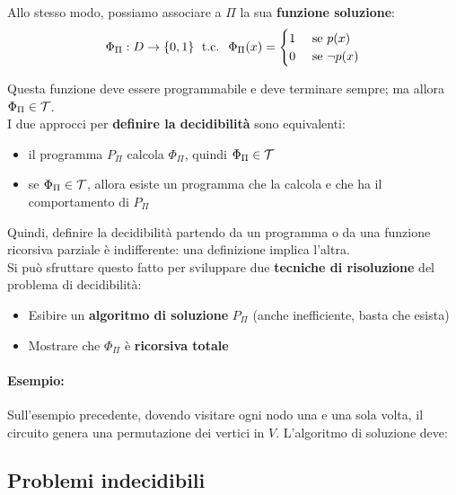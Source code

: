 Allo stesso modo, possiamo associare a $\Pi$ la sua \textbf{funzione soluzione}: 
$$ \Phi_\Pi : D \rightarrow \{0,1\} \; \text{ t.c. } \; \Phi_\Pi (x) = \begin{cases}
	1 & \text{ se } p(x) \\
	0 & \text{ se } \neg p(x)
\end{cases}$$

Questa funzione deve essere programmabile e deve terminare sempre; ma allora $\Phi_\Pi \in \mathcal{T}$.\\

I due approcci per \textbf{definire la decidibilità} sono equivalenti: 
\begin{itemize}
	\item il programma $P_\Pi$ calcola $\Phi_\Pi$, quindi $\Phi_\Pi \in \mathcal{T}$
	\item se $\Phi_\Pi \in \mathcal{T}$, allora esiste un programma che la calcola e che ha il comportamento di $P_\Pi$
\end{itemize}

Quindi, definire la decidibilità partendo da un programma o da una funzione ricorsiva parziale è indifferente: una definizione implica l'altra.\\

Si può sfruttare questo fatto per sviluppare due \textbf{tecniche di risoluzione} del problema di decidibilità: 
\begin{itemize}
	\item Esibire un \textbf{algoritmo di soluzione} $P_\Pi$ (anche inefficiente, basta che esista)
	\item Mostrare che $\Phi_\Pi$ è \textbf{ricorsiva totale}
\end{itemize}

\paragraph{Esempio:} Sull'esempio precedente, dovendo visitare ogni nodo una e una sola volta, il circuito genera una permutazione dei vertici in $V$. L'algoritmo di soluzione deve: 

\subsection{Problemi indecidibili}

